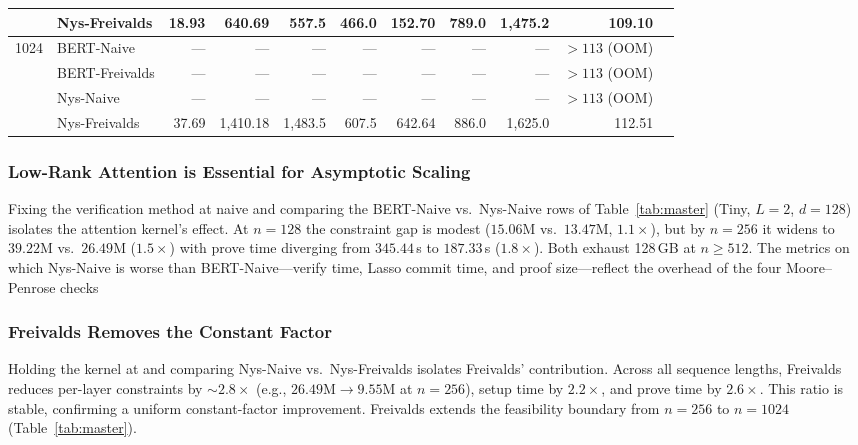 \documentclass[runningheads]{llncs}
\begin{document}
\begin{table}[!ht]
{\begin{tabular}{@{} cl rrrrrrrrr @{}}
  & Nys-Freivalds  & 18.93 & 640.69 & 557.5 & 466.0 & 152.70 & 789.0 & 1{,}475.2  & 109.10 \\
\midrule
\multirow{4}{*}{1024}
  & BERT-Naive     & ---   & ---    & ---   & ---   & ---    & ---   & ---        & ${>}113$ (OOM) \\
  & BERT-Freivalds & ---   & ---    & ---   & ---   & ---    & ---   & ---        & ${>}113$ (OOM) \\
  & Nys-Naive      & ---   & ---    & ---   & ---   & ---    & ---   & ---        & ${>}113$ (OOM) \\
  & Nys-Freivalds  & 37.69 & 1{,}410.18 & 1{,}483.5 & 607.5 & 642.64 & 886.0 & 1{,}625.0  & 112.51 \\
\bottomrule
\end{tabular}%
}
\end{table}

\subsubsection{Low-Rank Attention is Essential for Asymptotic Scaling}
\label{subsec:lowrank-essential}
Fixing the verification method at naive and comparing the BERT-Naive vs.\ Nys-Naive rows of Table~\ref{tab:master} (Tiny, $L{=}2$, $d{=}128$) isolates the attention kernel's effect. At $n{=}128$ the constraint gap is modest ($15.06$M vs.\ $13.47$M, $1.1{\times}$), but by $n{=}256$ it widens to $39.22$M vs.\ $26.49$M ($1.5{\times}$) with prove time diverging from $345.44$\,s to $187.33$\,s ($1.8{\times}$). Both exhaust 128\,GB at $n{\geq}512$. The metrics on which Nys-Naive is worse than BERT-Naive---verify time, Lasso commit time, and proof size---reflect the overhead of the four Moore--Penrose checks %

\subsubsection{Freivalds Removes the Constant Factor}
\label{subsec:freivalds-benefit}
Holding the kernel at \nystrom and comparing Nys-Naive vs.\ Nys-Freivalds isolates Freivalds' contribution. Across all sequence lengths, Freivalds reduces per-layer constraints by ${\sim}2.8{\times}$ (e.g., $26.49$M$\to$$9.55$M at $n{=}256$), setup time by $2.2{\times}$, and prove time by $2.6{\times}$. This ratio is stable, confirming a uniform constant-factor improvement. Freivalds extends the feasibility boundary from $n{=}256$ to $n{=}1024$ (Table~\ref{tab:master}).
\end{document}
